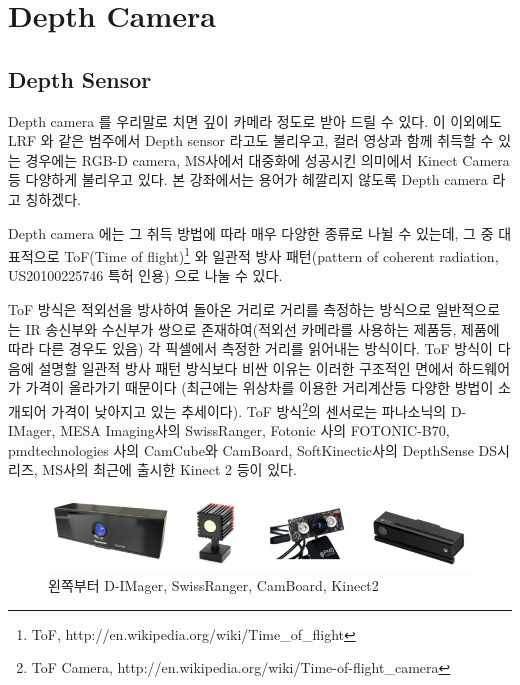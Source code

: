 \section{Depth Camera}

\subsection{Depth Sensor}

Depth camera 를 우리말로 치면 깊이 카메라 정도로 받아 드릴 수 있다. 이 이외에도 LRF 와 같은 범주에서 Depth sensor 라고도 불리우고, 컬러 영상과 함께 취득할 수 있는 경우에는 RGB-D camera, MS사에서 대중화에 성공시킨 의미에서 Kinect Camera 등 다양하게 불리우고 있다. 본 강좌에서는 용어가 헤깔리지 않도록 Depth camera 라고 칭하겠다.

Depth camera 에는 그 취득 방법에 따라 매우 다양한 종류로 나뉠 수 있는데, 그 중 대표적으로 ToF(Time of flight)\footnote{ToF, http://en.wikipedia.org/wiki/Time\_of\_flight} 와 일관적 방사 패턴(pattern of coherent radiation, US20100225746 특허 인용) 으로 나눌 수 있다.

ToF 방식은 적외선을 방사하여 돌아온 거리로 거리를 측정하는 방식으로 일반적으로는 IR 송신부와 수신부가 쌍으로 존재하여(적외선 카메라를 사용하는 제품등, 제품에 따라 다른 경우도 있음) 각 픽셀에서 측정한 거리를 읽어내는 방식이다. ToF 방식이 다음에 설명할 일관적 방사 패턴 방식보다 비싼 이유는 이러한 구조적인 면에서 하드웨어가 가격이 올라가기 때문이다 (최근에는 위상차를 이용한 거리계산등 다양한 방법이 소개되어 가격이 낮아지고 있는 추세이다). ToF 방식\footnote{ToF Camera, http://en.wikipedia.org/wiki/Time-of-flight\_camera}의 센서로는 파나소닉의 D-IMager, MESA Imaging사의 SwissRanger, Fotonic 사의 FOTONIC-B70, pmdtechnologies 사의 CamCube와 CamBoard, SoftKinectic사의 DepthSense DS시리즈, MS사의 최근에 출시한 Kinect 2 등이 있다.

\begin{figure}[h]
\centering\includegraphics[width=0.9\columnwidth]{pictures/chapter9/tof.png}
\caption{왼쪽부터 D-IMager, SwissRanger, CamBoard, Kinect2}
\end{figure}

